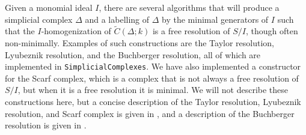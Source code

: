 \documentclass[12pt,leqno]{amsart}
\theoremstyle{definition}
\begin{document}
Given a monomial ideal $I$, there are several algorithms that will produce a
simplicial complex $\Delta$ and a labelling of $\Delta$ by the minimal
generators of $I$ such that the $I$-homogenization of
$\widetilde C(\Delta; k)$ is a free resolution of $S/I$, though often
non-minimally. Examples of such constructions are the Taylor resolution,
Lyubeznik resolution, and the Buchberger resolution, all of which are
implemented in \texttt{SimplicialComplexes}. We have also implemented a
constructor for the Scarf complex, which is a complex that is not always a
free resolution of $S/I$, but when it is a free resolution it is minimal. We
will not describe these constructions here, but a concise description of the
Taylor resolution, Lyubeznik resolution, and Scarf complex is given in
\cite{Mermin}, and a description of the Buchberger resolution is given in
\cite{OW}.
\end{document}
